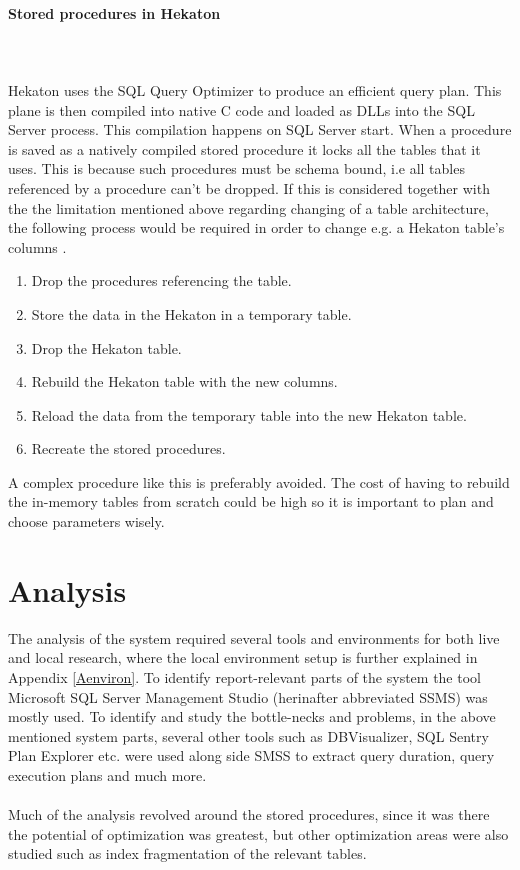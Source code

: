 \documentclass{cslthse-msc}
\begin{document}
\paragraph*{Stored procedures in Hekaton}\mbox{}\\\\ 
Hekaton uses the SQL Query Optimizer to produce an efficient query plan. This plane is then compiled into native C code and loaded as DLLs into the SQL Server process. This compilation happens on SQL Server start.
When a procedure is saved as a natively  compiled stored procedure it locks all the tables that it uses. This is because such procedures must be schema bound, i.e all tables referenced by a procedure can't be dropped. If this is considered together with the the limitation mentioned above regarding changing of a table architecture, the following process would be required in order to change e.g. a Hekaton table's columns   \cite{Nevarez}.
\begin{enumerate}
\item Drop the procedures referencing the table.
\item Store the data in the Hekaton in a temporary table.
\item Drop the Hekaton table.
\item Rebuild the Hekaton table with the new columns.
\item Reload the data from the temporary table into the new Hekaton table. 
\item Recreate the stored procedures.
\end{enumerate}

A complex procedure like this is preferably avoided. The cost of having to rebuild the in-memory tables from scratch could be high so it is important to plan and choose parameters wisely.


\section{Analysis}\label{sec:analysis}
The analysis of the system required several tools and environments for both live and local research, where the local environment setup is further explained in Appendix \ref{Aenviron}. To identify report-relevant parts of the system the tool Microsoft SQL Server Management Studio (herinafter abbreviated SSMS) was mostly used. To identify and study the bottle-necks and problems, in the above mentioned system parts, several other tools such as DBVisualizer, SQL Sentry Plan Explorer etc. were used along side SMSS to extract query duration, query execution plans and much more.\\\\
Much of the analysis revolved around the stored procedures, since it was there the potential of optimization was greatest, but other optimization areas were also studied such as index fragmentation of the relevant tables.      
\end{document}
